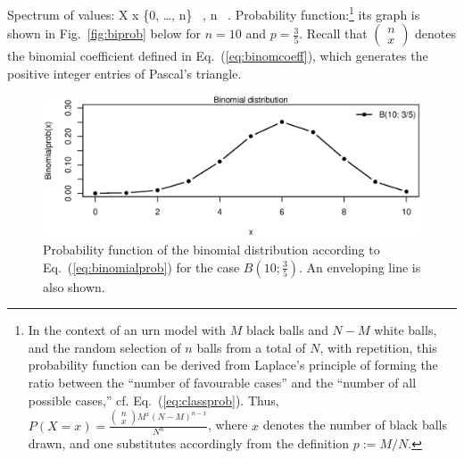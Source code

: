 \medskip
\noindent
Spectrum of values:
%
\be
X \mapsto x \in \left\{0, \ldots, n\right\} \ , 
\quad\quad{}\quad n \in {} \ .
\ee
%
Probability function:\footnote{In the context of an urn model with 
$M$ black balls and $N-M$ white balls, and the random selection of 
$n$ balls from a total of $N$, with repetition, this probability 
function can be derived from Laplace's principle of forming the 
ratio between the ``number of favourable cases'' and the ``number 
of all possible cases,'' cf. Eq.~(\ref{eq:classprob}). Thus,
$\displaystyle P(X=x) = \frac{\left(\begin{array}{c}
n \\
x
\end{array}\right)M^{x}(N-M)^{n-x}}{N^{n}}$,
where $x$ denotes the number of black balls drawn, and one 
substitutes accordingly from the definition $p:=M/N$.}
%
\be
{}
\ee
%
its graph is shown in Fig.~\ref{fig:biprob} below for 
$n=10$ and $\displaystyle p=\frac{3}{5}$. Recall that 
$\left(\begin{array}{c} n \\ x \end{array}\right)$ denotes the 
binomial coefficient defined in Eq.~(\ref{eq:binomcoeff}), which
generates the positive integer entries of Pascal's triangle.
%
\begin{figure}[!htb]
\begin{center}
\includegraphics[scale=0.8]{biprob.eps}
\end{center}
\caption{Probability function of the binomial distribution 
according to Eq.~(\ref{eq:binomialprob}) for the case 
$\displaystyle B\left(10;\frac{3}{5}\right)$. An enveloping line is
also shown.}
\end{figure}
%

